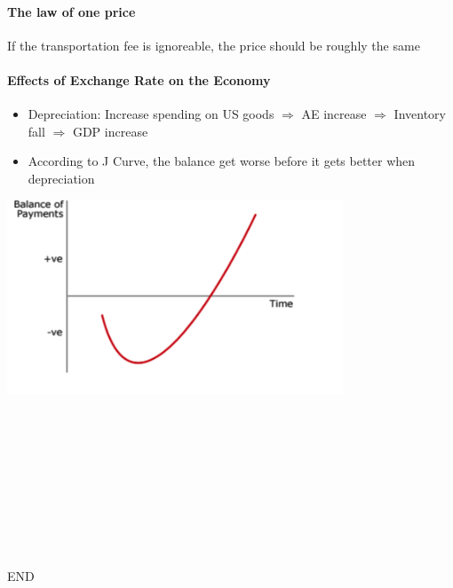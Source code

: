 \documentclass[11pt]{article}
\begin{document}
\paragraph{The law of one price}
If the transportation fee is ignoreable, the price should be roughly the same

\paragraph{Effects of Exchange Rate on the Economy}
\begin{itemize}
    \item Depreciation: Increase spending on US goods $\Rightarrow$ AE increase $\Rightarrow$ Inventory fall $\Rightarrow$ GDP increase
    \item According to J Curve, the balance get worse before it gets better when depreciation 
\end{itemize}
    
\includegraphics[width=10cm]{J.png}
\\\\\\\\\\\\\\\\\\\\
\centerline{END}
\end{document}

